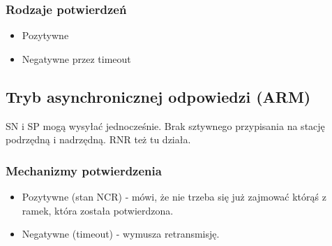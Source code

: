 \documentclass[a4paper,twoside]{article}
\begin{document}
	\subsubsection{Rodzaje potwierdzeń}
		\begin{itemize}
			\item Pozytywne
			\item Negatywne przez timeout
		\end{itemize}
	
	\subsection{Tryb asynchronicznej odpowiedzi (ARM)}
		SN i SP mogą wysyłać jednocześnie. Brak sztywnego przypisania na stację podrzędną i nadrzędną. RNR też tu działa.
	\subsubsection{Mechanizmy potwierdzenia}
		\begin{itemize}
			\item Pozytywne (stan NCR) - mówi, że nie trzeba się już zajmować którąś z ramek, która została potwierdzona.
			\item Negatywne (timeout) - wymusza retransmisję.
		\end{itemize}
\end{document}
